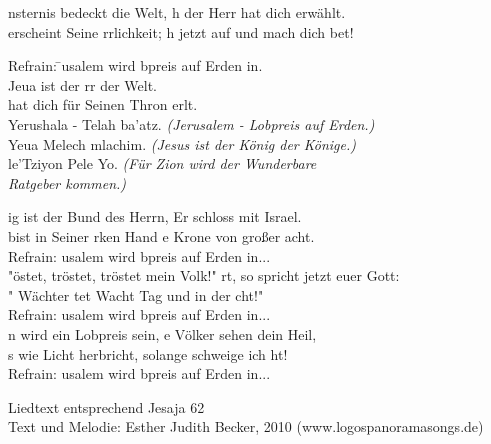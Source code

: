 
nsternis bedeckt die Welt, h der Herr hat dich erwählt.\\
 erscheint Seine rrlichkeit; h jetzt auf und mach dich bet!

\begin{tabbing}
Refrain: \= usalem wird  bpreis auf Erden in. \\
	 \> Jeua ist der rr der Welt.\\ 
	 \>  hat dich für Seinen Thron erlt.\\
	\>  Yerushala - Telah ba'atz. \hspace{30px} \= \textit{(Jerusalem - Lobpreis auf Erden.)}\\
	\>  Yeua Melech mlachim. \>	\textit{(Jesus ist der König der Könige.)}\\
	\>   le'Tziyon Pele Yo. \>	\textit{(Für Zion wird der Wunderbare}\\
    \> \> \textit{Ratgeber kommen.)}
\end{tabbing} 

ig ist der Bund des Herrn,  Er schloss mit Israel.\\
 bist in Seiner rken Hand e Krone von großer acht.\\

Refrain: usalem wird  bpreis auf Erden in... \\

"östet, tröstet, tröstet mein Volk!" rt, so spricht jetzt euer Gott:\\
" Wächter tet Wacht  Tag und in der cht!"\\

Refrain: usalem wird  bpreis auf Erden in... \\ 

n wird ein Lobpreis sein, e Völker sehen dein Heil,\\
s wie Licht herbricht,  solange schweige ich ht! \\

Refrain: usalem wird  bpreis auf Erden in... \\ 

\begin{footnotesize}
Liedtext entsprechend Jesaja 62\\
Text und Melodie: Esther Judith Becker, 2010 (www.logospanoramasongs.de)
\end{footnotesize}